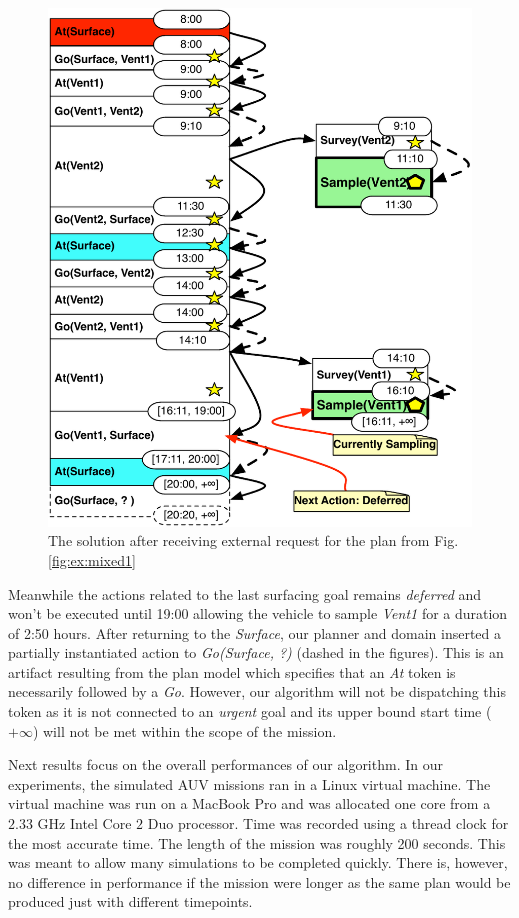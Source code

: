 \begin{figure}[t]
  \centering
  \includegraphics[width=0.8\columnwidth]{figs/example_MixedUpdate}
  \caption{\small The solution after receiving external request for
    the plan from Fig. \ref{fig:ex:mixed1}}
  \label{fig:ex:mixed2}
\end{figure}

Meanwhile the actions related to the last surfacing goal remains {\em
  deferred} and won't be executed until 19:00 allowing the vehicle to
sample {\em Vent1} for a duration of 2:50 hours.  After returning to
the {\em Surface}, our planner and domain inserted a partially
instantiated action to {\em Go(Surface, ?)} (dashed in the figures).
This is an artifact resulting from the plan model which specifies that
an {\em At} token is necessarily followed by a {\em Go}.  However, our
algorithm will not be dispatching this token as it is not connected to
an {\em urgent} goal and its upper bound start time ($+\infty$) will
not be met within the scope of the mission.

Next results focus on the overall performances of our algorithm. In
our experiments, the simulated AUV missions ran in a Linux virtual
machine. The virtual machine was run on a MacBook Pro and was
allocated one core from a $2.33$ GHz Intel Core $2$ Duo processor.
Time was recorded using a thread clock for the most accurate time.
The length of the mission was roughly 200 seconds. This was meant to
allow many simulations to be completed quickly. There is, however, no
difference in performance if the mission were longer as the same plan
would be produced just with different timepoints.
 
